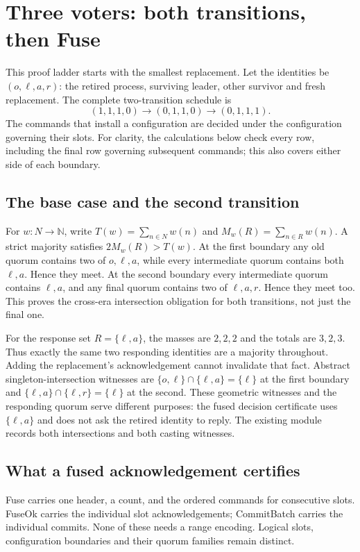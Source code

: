 \section{Three voters: both transitions, then Fuse}\label{sec:fuse}
This proof ladder starts with the smallest replacement. Let the identities be
$(o,\ell,a,r)$: the retired process, surviving leader, other survivor and fresh
replacement. The complete two-transition schedule is
\[
 (1,1,1,0)\longrightarrow(0,1,1,0)\longrightarrow(0,1,1,1).
\]
The commands that install a configuration are decided under the configuration
governing their slots. For clarity, the calculations below check every row,
including the final row governing subsequent commands; this also covers either
side of each boundary.

\subsection{The base case and the second transition}
For $w:N\to\mathbb N$, write $T(w)=\sum_{n\in N}w(n)$ and
$M_w(R)=\sum_{n\in R}w(n)$. A strict majority satisfies $2M_w(R)>T(w)$.
At the first boundary any old quorum contains two of $o,\ell,a$, while every
intermediate quorum contains both $\ell,a$. Hence they meet. At the second
boundary every intermediate quorum contains $\ell,a$, and any final quorum
contains two of $\ell,a,r$. Hence they meet too. This proves the cross-era
intersection obligation for both transitions, not just the final one.

For the response set $R=\{\ell,a\}$, the masses are $2,2,2$ and the totals
are $3,2,3$. Thus exactly the same two responding identities are a majority
throughout. Adding the replacement's acknowledgement cannot invalidate that
fact. Abstract singleton-intersection witnesses are
$\{o,\ell\}\cap\{\ell,a\}=\{\ell\}$ at the first boundary and
$\{\ell,a\}\cap\{\ell,r\}=\{\ell\}$ at the second.
These geometric witnesses and the responding quorum serve different purposes:
the fused decision certificate uses $\{\ell,a\}$ and does not ask the retired
identity to reply. The existing module  records
both intersections and both casting witnesses.

\subsection{What a fused acknowledgement certifies}
Fuse carries one header, a count, and the ordered commands for consecutive
slots. FuseOk carries the individual slot acknowledgements; CommitBatch carries
the individual commits. None of these needs a range encoding. Logical slots,
configuration boundaries and their quorum families remain distinct.

